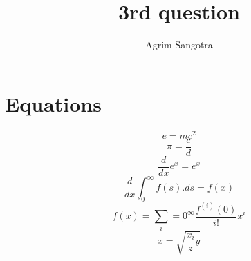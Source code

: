 \documentclass{article}
\title{3rd question}
\author{Agrim Sangotra}
\date{}
\begin{document}
\maketitle
\section{Equations}
\begin{equation}e=mc^2\end{equation}
\begin{equation}\pi=\frac{c}{d}\end{equation}
\begin{equation}\frac{d}{dx}e^x=e^x\end{equation}
\begin{equation}\frac{d}{dx}\int_0^\infty f(s).ds=f(x)\end{equation}
\begin{equation}f(x)=\sum_i=0^\infty\frac{f^{(i)} (0)}{i!}x^i\end{equation}
\begin{equation}x=\sqrt{\frac{x_i}{z}y}\end{equation}
\end{document}
